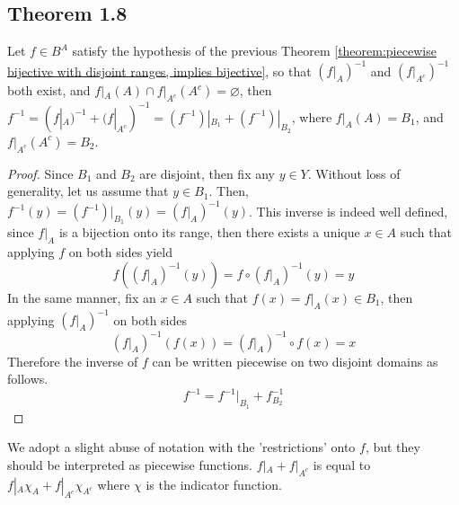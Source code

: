 \documentclass[../../main.tex]{subfiles}
\begin{document}
\subsection{Theorem 1.8}
\begin{wts}\label{theorem:piecewise bijections with disjoint ranges, inverse is the sum of piecewise inverses}
Let $f\in B^A$ satisfy the hypothesis of the previous Theorem \ref{theorem:piecewise bijective with disjoint ranges, implies bijective}, so that $(f|_{A})^{-1}$ and $(f|_{A^c})^{-1}$ both exist, and $f|_A(A)\cap f|_{A^c}(A^c)=\varnothing$, then $f^{-1} = (f|_{A})^{-1} + (f|_{A^c})^{-1} = (f^{-1})|_{B_1} + (f^{-1})|_{B_2}$, where $f|_{A}(A) = B_1$, and $f|_{A^c}(A^c)=B_2$.
\end{wts}
\begin{proof}
    Since $B_1$ and $B_2$ are disjoint, then fix any $y\in Y$. Without loss of generality, let us assume that $y\in B_1$. Then, $f^{-1}(y) = (f^{-1})|_{B_1}(y) = (f|_{A})^{-1}(y)$. This inverse is indeed well defined, since $f|_{A}$ is a bijection onto its range, then there exists a unique $x\in A$ such that applying $f$ on both sides yield
    \[
    f\left((f|_{A})^{-1}(y)\right) =f\circ (f|_A)^{-1} (y)= y
    \]
    In the same manner, fix an $x\in A$ such that $f(x)=f|_{A}(x)\in B_1$, then applying $(f|_{A})^{-1}$ on both sides
    \[
    (f|_A)^{-1}\left(f(x)\right) = (f|_{A})^{-1}\circ f (x)= x
    \]
    Therefore the inverse of $f$ can be written piecewise on two disjoint domains as follows.
    \[
    f^{-1} = f^{-1}|_{B_1} + f^{-1}_{B_2}
    \]
\end{proof}
\remark We adopt a slight abuse of notation with the 'restrictions' onto $f$, but they should be interpreted as piecewise functions. $f|_A + f|_{A^c}$ is equal to $f|_{A}\chi_A + f|_{A^c}\chi_{A^c}$ where $\chi$ is the indicator function.\\
\end{document}
